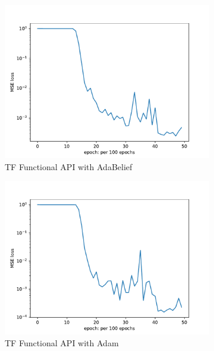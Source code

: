\documentclass[10pt,journal,compsoc,onecolumn]{IEEEtran}
\begin{document}
\begin{figure}[htbp]
    \centering
    \begin{subfigure}[b]{0.45\textwidth}
        \includegraphics[width=\textwidth]{../../results/functional/low-frequency-adabelief-20250206-1105-4/loss}
        \caption{TF Functional API with AdaBelief}
    \end{subfigure}
    \begin{subfigure}[b]{0.45\textwidth}
        \includegraphics[width=\textwidth]{../../results/functional/low-frequency-adam-20250206-1105-1/loss}
        \caption{TF Functional API with Adam}
    \end{subfigure}
    \begin{subfigure}[b]{0.45\textwidth}

\end{subfigure}
\end{figure}
\end{document}
